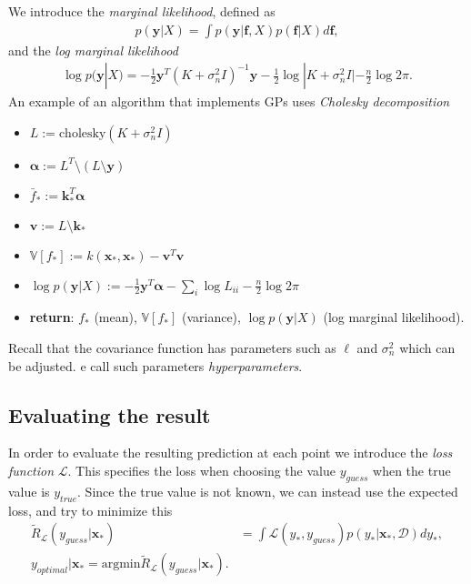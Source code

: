 \documentclass[twoside,english]{uiofysmaster}
\begin{document}
We introduce the \textit{marginal likelihood}, defined as
\begin{align}\label{Eq:: Marginal likelihood}
p(\textbf{y}|X) = \int p (\textbf{y}|\textbf{f}, X) p (\textbf{f}|X)d \textbf{f},
\end{align}
and the \textit{log marginal likelihood}
\begin{align}\label{Eq:: Log marginal likelihood}
\log p(\textbf{y}|X) = - \frac{1}{2} \textbf{y}^T (K+ \sigma_n^2I)^{-1} \textbf{y} - \frac{1}{2} \log |K+ \sigma_n^2 I | - \frac{n}{2} \log 2 \pi.
\end{align}
An example of an algorithm that implements GPs uses \textit{Cholesky decomposition}
\begin{itemize}
\item $L := \text{cholesky}(K+\sigma_n^2 I)$
\item $\boldsymbol{\alpha} := L^T \setminus (L\setminus \textbf{y})$
\item $\bar{f}_* := \textbf{k}_*^T \boldsymbol{\alpha}$
\item $\textbf{v} := L\setminus \textbf{k}_*$
\item $\mathbb{V}[f_*] := k(\textbf{x}_*,\textbf{x}_*) - \textbf{v}^T \textbf{v}$
\item $\log p(\textbf{y}|X) := - \frac{1}{2}\textbf{y}^T \boldsymbol{\alpha} - \sum_i \log L_{ii} - \frac{n}{2} \log 2 \pi$
\item \textbf{return}: $f_*$ (mean), $\mathbb{V}[f_*]$ (variance), $\log p(\textbf{y}|X)$ (log marginal likelihood).
\end{itemize}

Recall that the covariance function has parameters such as $\ell$ and $\sigma_n^2$ which can be adjusted. e call such parameters \textit{hyperparameters}. 

\subsection{Evaluating the result}

In order to evaluate the resulting prediction at each point we introduce the \textit{loss function} $\mathcal{L}$. This specifies the loss when choosing the value $y_{guess}$ when the true value is $y_{true}$. Since the true value is not known, we can instead use the expected loss, and try to minimize this 
\begin{align}
\tilde{R}_{\mathcal{L}} (y_{guess}|\textbf{x}_*) &= \int \mathcal{L}(y_*,y_{guess})p(y_*|\textbf{x}_*, \mathcal{D})dy_*,\\
y_{optimal}|\textbf{x}_* = \text{argmin} \tilde{R}_{\mathcal{L}} (y_{guess}|\textbf{x}_*).
\end{align}
\end{document}
